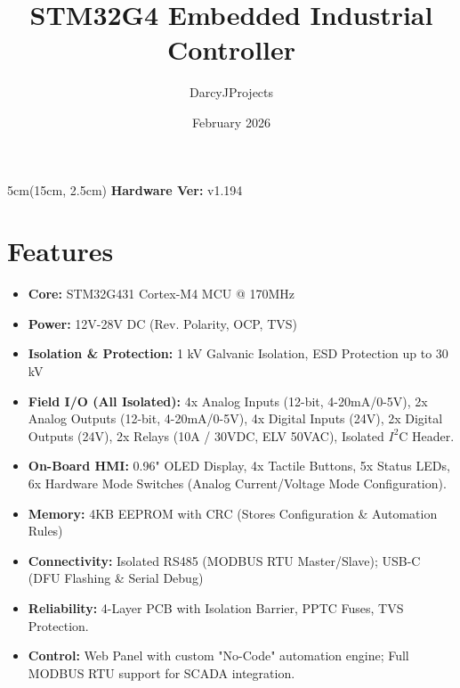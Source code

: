 \documentclass[10pt]{datasheet}
\title{STM32G4 Embedded Industrial Controller}
\author{DarcyJProjects}
\date{February 2026}
\begin{document}
\begin{textblock*}{5cm}(15cm, 2.5cm) 
    \raggedleft %
    \small 
    \textbf{Hardware Ver:} v1.194
\end{textblock*}

\maketitle

\section{Features}
\begin{itemize}[leftmargin=*, itemsep=2pt, topsep=0pt]
    \item \textbf{Core:} STM32G431 Cortex-M4 MCU @ 170MHz
    \item \textbf{Power:} 12V-28V DC (Rev. Polarity, OCP, TVS)
    \item \textbf{Isolation \& Protection:} 1 kV Galvanic Isolation, ESD Protection up to 30 kV
    
    \item \textbf{Field I/O (All Isolated):}
    4x Analog Inputs (12-bit, 4-20mA/0-5V),
    2x Analog Outputs (12-bit, 4-20mA/0-5V),
    4x Digital Inputs (24V),
    2x Digital Outputs (24V),
    2x Relays (10A / 30VDC, ELV 50VAC),
    Isolated $I^2$C Header.

    \item \textbf{On-Board HMI:} 
    0.96" OLED Display, 
    4x Tactile Buttons, 
    5x Status LEDs, 
    6x Hardware Mode Switches (Analog Current/Voltage Mode Configuration).

    \item \textbf{Memory:} 4KB EEPROM with CRC (Stores Configuration \& Automation Rules)

    \item \textbf{Connectivity:}
    Isolated RS485 (MODBUS RTU Master/Slave);
    USB-C (DFU Flashing \& Serial Debug)

    \item \textbf{Reliability:} 4-Layer PCB with Isolation Barrier, PPTC Fuses, TVS Protection.
    \item \textbf{Control:} Web Panel with custom "No-Code" automation engine; Full MODBUS RTU support for SCADA integration.
\end{itemize}
\end{document}
